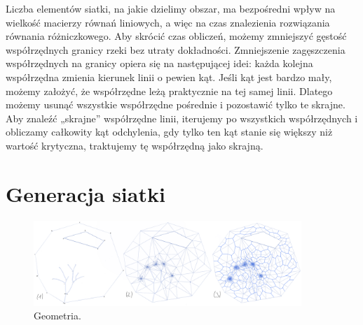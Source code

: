 \documentclass[]{pracamgr}
\begin{document}
      Liczba elementów siatki, na jakie dzielimy obszar, ma bezpośredni wpływ na wielkość macierzy równań liniowych, a więc na czas znalezienia rozwiązania równania różniczkowego. Aby skrócić czas obliczeń, możemy zmniejszyć gęstość współrzędnych granicy rzeki bez utraty dokładności. Zmniejszenie zagęszczenia współrzędnych na granicy opiera się na następującej idei: każda kolejna współrzędna zmienia kierunek linii o pewien kąt. Jeśli kąt jest bardzo mały, możemy założyć, że współrzędne leżą praktycznie na tej samej linii. Dlatego możemy usunąć wszystkie współrzędne pośrednie i pozostawić tylko te skrajne. Aby znaleźć „skrajne” współrzędne linii, iterujemy po wszystkich współrzędnych i obliczamy całkowity kąt odchylenia, gdy tylko ten kąt stanie się większy niż wartość krytyczna, traktujemy tę współrzędną jako skrajną.

    \section{Generacja siatki}

      \begin{figure}[H]
        \centering
        \includegraphics[width=0.9\textwidth]{figs/mesh_generation.png}        
        \caption {Geometria.}
        \label{mesh_generation}
      \end{figure}
\end{document}
